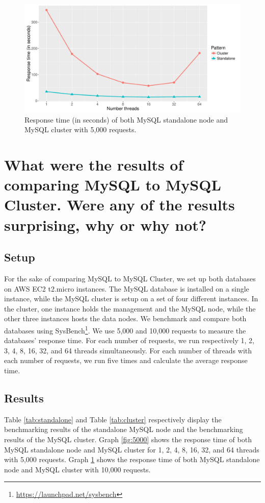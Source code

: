 \documentclass{article}
\begin{document}
  
\begin{figure}[!]
    \centering
        \includegraphics[width = \columnwidth]{images/10000.pdf}
    \caption{Response time (in seconds) of both MySQL standalone node and MySQL cluster with 5,000 requests.}
    \label{fig:10000}
\end{figure}



\section{What were the results of comparing MySQL to MySQL Cluster. Were any of the results surprising, why or why not?}\label{Q1}
\subsection{Setup}
For the sake of comparing MySQL to MySQL Cluster, we set up both databases on AWS EC2 t2.micro instances. The MySQL database is installed on a single instance, while the MySQL cluster is setup on a set of four different instances. In the cluster, one instance holds the management and the MySQL node, while the other three instances hosts the data nodes. We benchmark and compare both databases using SysBench\footnote{\url{https://launchpad.net/sysbench}}. We use 5,000 and 10,000 requests to measure the databases' response time. For each number of requests, we run respectively 1, 2, 3, 4, 8, 16, 32, and 64 threads simultaneously. For each number of threads with each number of requests, we run five times and calculate the average response time.


\subsection{Results}
Table \ref{tab:standalone} and Table \ref{tab:cluster} respectively display the benchmarking results of the standalone MySQL node and the benchmarking results of the MySQL cluster. Graph \ref{fig:5000} shows the response time of both MySQL standalone node and MySQL cluster for 1, 2, 4, 8, 16, 32, and 64 threads with 5,000 requests. Graph \ref{fig:10000} shows the response time of both MySQL standalone node and MySQL cluster with 10,000 requests.\\
\end{document}
